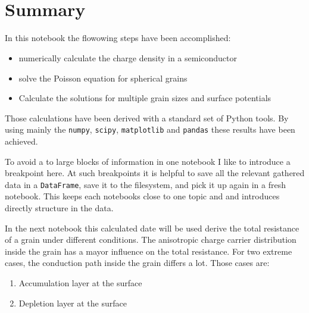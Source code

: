 \documentclass[11pt]{article}
\providecommand{\tightlist}{%
      \setlength{\itemsep}{0pt}\setlength{\parskip}{0pt}}
\begin{document}
    \begin{center}
    \end{center}
    { \hspace*{\fill} \\}
    
    \begin{center}
    \end{center}
    { \hspace*{\fill} \\}
    
    \hypertarget{summary}{%
\section{Summary}\label{summary}}

In this notebook the flowowing steps have been accomplished:

\begin{itemize}
\tightlist
\item
  numerically calculate the charge density in a semiconductor
\item
  solve the Poisson equation for spherical grains
\item
  Calculate the solutions for multiple grain sizes and surface
  potentials
\end{itemize}

Those calculations have been derived with a standard set of Python
tools. By using mainly the \texttt{numpy}, \texttt{scipy},
\texttt{matplotlib} and \texttt{pandas} these results have been
achieved.

To avoid a to large blocks of information in one notebook I like to
introduce a breakpoint here. At such breakpoints it is helpful to save
all the relevant gathered data in a \texttt{DataFrame}, save it to the
filesystem, and pick it up again in a fresh notebook. This keeps each
notebooks close to one topic and and introduces directly structure in
the data.

In the next notebook this calculated date will be used derive the total
resistance of a grain under different conditions. The anisotropic charge
carrier distribution inside the grain has a mayor influence on the total
resistance. For two extreme cases, the conduction path inside the grain
differs a lot. Those cases are:

\begin{enumerate}
\def\labelenumi{\arabic{enumi}.}
\tightlist
\item
  Accumulation layer at the surface
\item
  Depletion layer at the surface
\end{enumerate}
\end{document}
